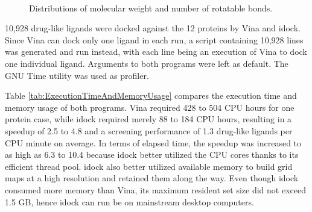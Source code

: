 \documentclass[10pt,conference,compsocconf]{../IEEEtran}
\begin{document}
\begin{figure}
{}
\\
\caption{Distributions of molecular weight and number of rotatable bonds.}
\label{MWT-NRB}
\end{figure}

10,928 drug-like ligands were docked against the 12 proteins by Vina and idock. Since Vina can dock only one ligand in each run, a script containing 10,928 lines was generated and run instead, with each line being an execution of Vina to dock one individual ligand. Arguments to both programs were left as default. The GNU Time utility was used as profiler.

Table \ref{tab:ExecutionTimeAndMemoryUsage} compares the execution time and memory usage of both programs. Vina required 428 to 504 CPU hours for one protein case, while idock required merely 88 to 184 CPU hours, resulting in a speedup of 2.5 to 4.8 and a screening performance of 1.3 drug-like ligands per CPU minute on average. In terms of elapsed time, the speedup was increased to as high as 6.3 to 10.4 because idock better utilized the CPU cores thanks to its efficient thread pool. idock also better utilized available memory to build grid maps at a high resolution and retained them along the way. Even though idock consumed more memory than Vina, its maximum resident set size did not exceed 1.5 GB, hence idock can run be on mainstream desktop computers.
\end{document}

